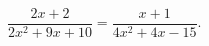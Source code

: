 \begin{ex}[type=equation]
	\begin{condition}
		$\dfrac{2x + 2}{2x^2 + 9x + 10} = \dfrac{x + 1}{4x^2 + 4x - 15}.$
	\end{condition}
\end{ex}